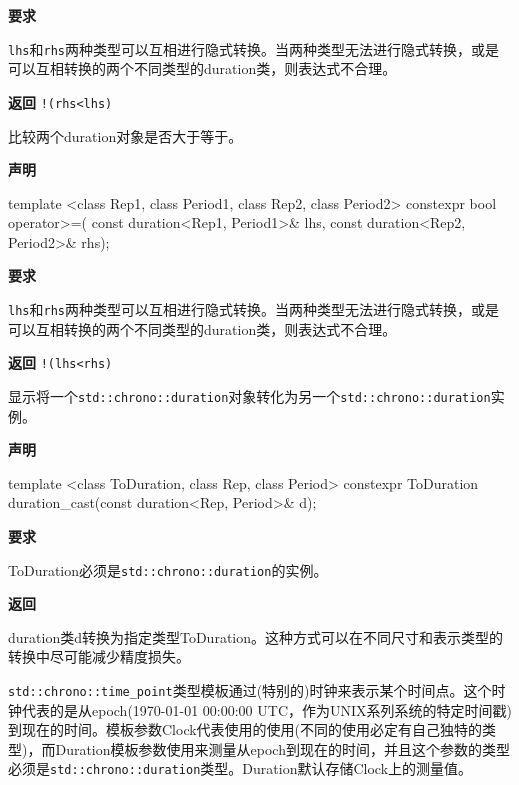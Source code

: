 \textbf{要求}

\texttt{lhs}和\texttt{rhs}两种类型可以互相进行隐式转换。当两种类型无法进行隐式转换，或是可以互相转换的两个不同类型的duration类，则表达式不合理。

\textbf{返回}
\texttt{!(rhs<lhs)}


比较两个duration对象是否大于等于。

\textbf{声明}

\begin{cpp}
template <class Rep1, class Period1, class Rep2, class Period2>
constexpr bool operator>=(
   const duration<Rep1, Period1>& lhs,
   const duration<Rep2, Period2>& rhs);
\end{cpp}

\textbf{要求}

\texttt{lhs}和\texttt{rhs}两种类型可以互相进行隐式转换。当两种类型无法进行隐式转换，或是可以互相转换的两个不同类型的duration类，则表达式不合理。

\textbf{返回}
\texttt{!(lhs<rhs)}


显示将一个\texttt{std::chrono::duration}对象转化为另一个\texttt{std::chrono::duration}实例。

\textbf{声明}

\begin{cpp}
template <class ToDuration, class Rep, class Period>
constexpr ToDuration duration_cast(const duration<Rep, Period>& d);
\end{cpp}

\textbf{要求}

ToDuration必须是\texttt{std::chrono::duration}的实例。

\textbf{返回}

duration类d转换为指定类型ToDuration。这种方式可以在不同尺寸和表示类型的转换中尽可能减少精度损失。


\texttt{std::chrono::time\_point}类型模板通过(特别的)时钟来表示某个时间点。这个时钟代表的是从epoch(1970-01-01 00:00:00 UTC，作为UNIX系列系统的特定时间戳)到现在的时间。模板参数Clock代表使用的使用(不同的使用必定有自己独特的类型)，而Duration模板参数使用来测量从epoch到现在的时间，并且这个参数的类型必须是\texttt{std::chrono::duration}类型。Duration默认存储Clock上的测量值。


